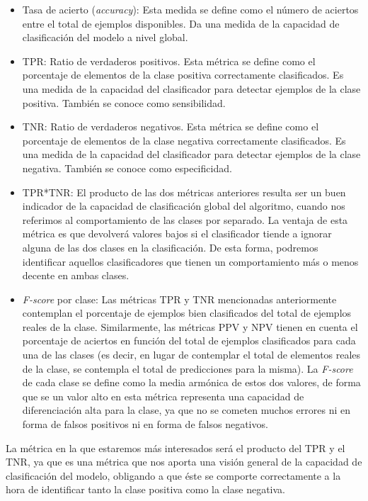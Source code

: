 \documentclass[
  a4paper,
,tablecaptionabove
]{scrartcl}
\providecommand{\tightlist}{%
  \setlength{\itemsep}{0pt}\setlength{\parskip}{0pt}}
\begin{document}
\begin{itemize}
\tightlist
\item
  Tasa de acierto (\emph{accuracy}): Esta medida se define como el
  número de aciertos entre el total de ejemplos disponibles. Da una
  medida de la capacidad de clasificación del modelo a nivel global.
\item
  TPR: Ratio de verdaderos positivos. Esta métrica se define como el
  porcentaje de elementos de la clase positiva correctamente
  clasificados. Es una medida de la capacidad del clasificador para
  detectar ejemplos de la clase positiva. También se conoce como
  sensibilidad.
\item
  TNR: Ratio de verdaderos negativos. Esta métrica se define como el
  porcentaje de elementos de la clase negativa correctamente
  clasificados. Es una medida de la capacidad del clasificador para
  detectar ejemplos de la clase negativa. También se conoce como
  especificidad.
\item
  TPR*TNR: El producto de las dos métricas anteriores resulta ser un
  buen indicador de la capacidad de clasificación global del algoritmo,
  cuando nos referimos al comportamiento de las clases por separado. La
  ventaja de esta métrica es que devolverá valores bajos si el
  clasificador tiende a ignorar alguna de las dos clases en la
  clasificación. De esta forma, podremos identificar aquellos
  clasificadores que tienen un comportamiento más o menos decente en
  ambas clases.
\item
  \emph{F-score} por clase: Las métricas TPR y TNR mencionadas
  anteriormente contemplan el porcentaje de ejemplos bien clasificados
  del total de ejemplos reales de la clase. Similarmente, las métricas
  PPV y NPV tienen en cuenta el porcentaje de aciertos en función del
  total de ejemplos clasificados para cada una de las clases (es decir,
  en lugar de contemplar el total de elementos reales de la clase, se
  contempla el total de predicciones para la misma). La \emph{F-score}
  de cada clase se define como la media armónica de estos dos valores,
  de forma que se un valor alto en esta métrica representa una capacidad
  de diferenciación alta para la clase, ya que no se cometen muchos
  errores ni en forma de falsos positivos ni en forma de falsos
  negativos.
\end{itemize}

La métrica en la que estaremos más interesados será el producto del TPR
y el TNR, ya que es una métrica que nos aporta una visión general de la
capacidad de clasificación del modelo, obligando a que éste se comporte
correctamente a la hora de identificar tanto la clase positiva como la
clase negativa.
\end{document}
